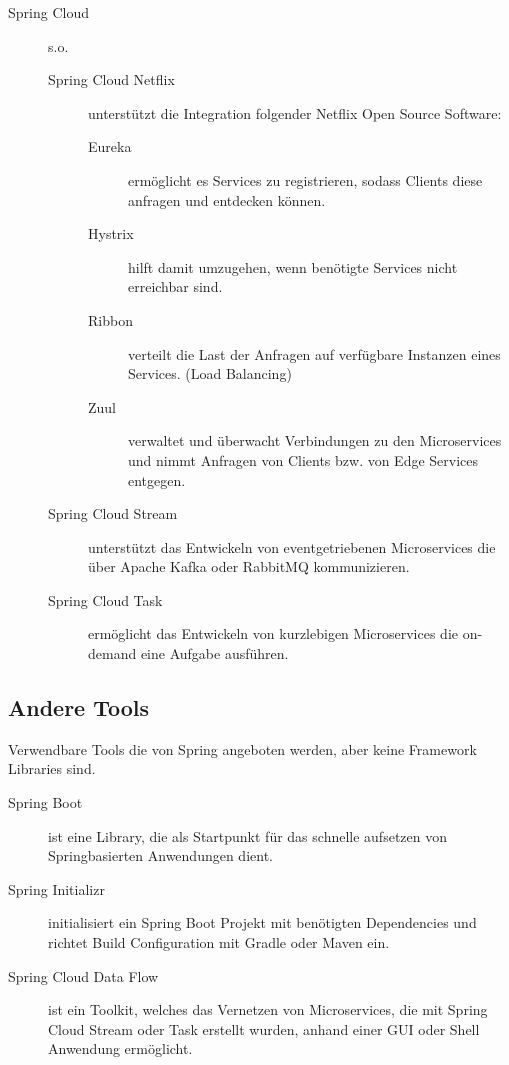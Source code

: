 \documentclass{article}
\begin{document}
\begin{description}
    \item[Spring Cloud] s.o.
    \begin{description}
        \item[Spring Cloud Netflix] unterstützt die Integration folgender Netflix Open Source Software:
        \begin{description}
            \item[Eureka] ermöglicht es Services zu registrieren, sodass Clients diese anfragen und entdecken können.
            \item[Hystrix] hilft damit umzugehen, wenn benötigte Services nicht erreichbar sind.
            \item[Ribbon] verteilt die Last der Anfragen auf verfügbare Instanzen eines Services. (Load Balancing)
            \item[Zuul] verwaltet und überwacht Verbindungen zu den Microservices und nimmt Anfragen von Clients bzw. von Edge Services entgegen.
        \end{description}

        \item[Spring Cloud Stream] unterstützt das Entwickeln von eventgetriebenen Microservices die über Apache Kafka oder RabbitMQ kommunizieren.
        \item[Spring Cloud Task] ermöglicht das Entwickeln von kurzlebigen Microservices die on-demand eine Aufgabe ausführen.
    \end{description}
\end{description}

\subsection{Andere Tools}

Verwendbare Tools die von Spring angeboten werden, aber keine Framework Libraries sind.

\begin{description}
    \item[Spring Boot] ist eine Library, die als Startpunkt für das schnelle aufsetzen von Springbasierten Anwendungen dient.
    \item[Spring Initializr] initialisiert ein Spring Boot Projekt mit benötigten Dependencies und richtet Build Configuration mit Gradle oder Maven ein.
    \item[Spring Cloud Data Flow] ist ein Toolkit, welches das Vernetzen von Microservices, die mit Spring Cloud Stream oder Task erstellt wurden, anhand einer GUI oder Shell Anwendung ermöglicht.
\end{description}
\end{document}
